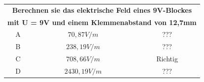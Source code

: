 \begin{frame}
	\begin{center}
	\begin{small}
	\begin{tabular}{|c|c|c|}
		\hline
		\multicolumn{3}{|c|}{\textbf{Berechnen sie das elektrische Feld eines 9V-Blockes}}\\
		\multicolumn{3}{|c|}{\textbf{mit U = 9V und einem Klemmenabstand von 12,7mm}}\\
		\hline
		A & $ 70,87 V/m $    & ??? \\ \hline
		B & $ 238,19 V/m $   & ??? \\ \hline
		C & $ 708,66 V/m $   & Richtig \\ \hline
		D & $ 2430,19 V/m $  & ??? \\ \hline
	\end{tabular}
	\end{small}		
	\end{center}
\end{frame}

